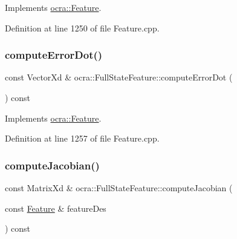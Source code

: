 Implements \hyperlink{classocra_1_1Feature_ac714181e1bb25f878349e299c4ba8c00}{ocra\+::\+Feature}.



Definition at line 1250 of file Feature.\+cpp.

\hypertarget{classocra_1_1FullStateFeature_af5d860acbb9dc600a432fcba952f95a7}{}\label{classocra_1_1FullStateFeature_af5d860acbb9dc600a432fcba952f95a7} 
\subsubsection{\texorpdfstring{compute\+Error\+Dot()}{computeErrorDot()}\hspace{0.1cm}{\footnotesize\ttfamily [2/2]}}
{\footnotesize\ttfamily const Vector\+Xd \& ocra\+::\+Full\+State\+Feature\+::compute\+Error\+Dot (\begin{DoxyParamCaption}{ }\end{DoxyParamCaption}) const\hspace{0.3cm}{\ttfamily [virtual]}}



Implements \hyperlink{classocra_1_1Feature_a01a4870418ba87d5b41d8f917c1255fc}{ocra\+::\+Feature}.



Definition at line 1257 of file Feature.\+cpp.

\hypertarget{classocra_1_1FullStateFeature_abcd0254d7836bea5531d49afff872d20}{}\label{classocra_1_1FullStateFeature_abcd0254d7836bea5531d49afff872d20} 
\subsubsection{\texorpdfstring{compute\+Jacobian()}{computeJacobian()}\hspace{0.1cm}{\footnotesize\ttfamily [1/2]}}
{\footnotesize\ttfamily const Matrix\+Xd \& ocra\+::\+Full\+State\+Feature\+::compute\+Jacobian (\begin{DoxyParamCaption}\item[{const \hyperlink{classocra_1_1Feature}{Feature} \&}]{feature\+Des }\end{DoxyParamCaption}) const\hspace{0.3cm}{\ttfamily [virtual]}}



